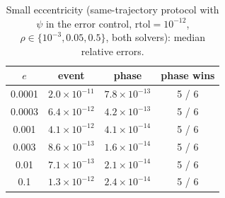 \begin{table}[!htbp]
\centering
\caption{Small eccentricity (same-trajectory protocol with $\psi$ in the error control, $\mathrm{rtol}=10^{-12}$, $\rho\in\{10^{-3},0.05,0.5\}$, both solvers): median relative errors.}
\label{tab:smalle}
\begin{tabular}{cccc}
\toprule
$e$ & event & phase & phase wins \\
\midrule
0.0001 & $2.0\times10^{-11}$ & $7.8\times10^{-13}$ & 5 / 6 \\
0.0003 & $6.4\times10^{-12}$ & $4.2\times10^{-13}$ & 5 / 6 \\
0.001 & $4.1\times10^{-12}$ & $4.1\times10^{-14}$ & 5 / 6 \\
0.003 & $8.6\times10^{-13}$ & $1.6\times10^{-14}$ & 5 / 6 \\
0.01 & $7.1\times10^{-13}$ & $2.1\times10^{-14}$ & 5 / 6 \\
0.1 & $1.3\times10^{-12}$ & $2.4\times10^{-14}$ & 5 / 6 \\
\bottomrule
\end{tabular}
\end{table}
